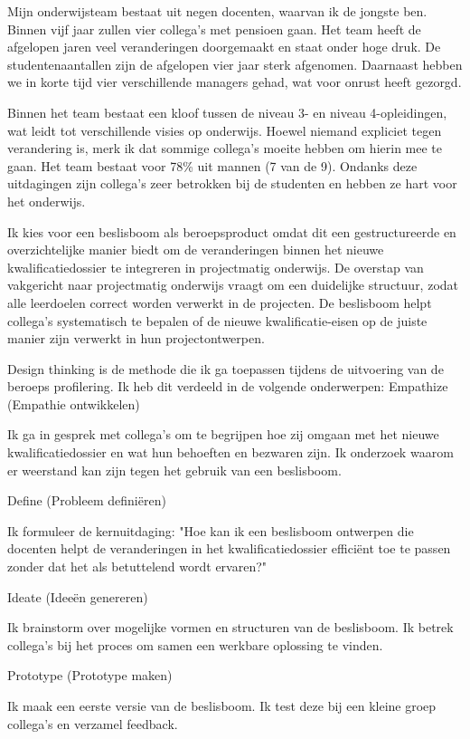 Mijn onderwijsteam bestaat uit negen docenten, waarvan ik de jongste ben. Binnen vijf jaar zullen vier collega’s met pensioen gaan. Het team heeft de afgelopen jaren veel veranderingen doorgemaakt en staat onder hoge druk. De studentenaantallen zijn de afgelopen vier jaar sterk afgenomen. Daarnaast hebben we in korte tijd vier verschillende managers gehad, wat voor onrust heeft gezorgd.

Binnen het team bestaat een kloof tussen de niveau 3- en niveau 4-opleidingen, wat leidt tot verschillende visies op onderwijs. Hoewel niemand expliciet tegen verandering is, merk ik dat sommige collega’s moeite hebben om hierin mee te gaan. Het team bestaat voor 78\% uit mannen (7 van de 9). Ondanks deze uitdagingen zijn collega’s zeer betrokken bij de studenten en hebben ze hart voor het onderwijs.

Ik kies voor een beslisboom als beroepsproduct omdat dit een gestructureerde en overzichtelijke manier biedt om de veranderingen binnen het nieuwe kwalificatiedossier te integreren in projectmatig onderwijs. De overstap van vakgericht naar projectmatig onderwijs vraagt om een duidelijke structuur, zodat alle leerdoelen correct worden verwerkt in de projecten. De beslisboom helpt collega’s systematisch te bepalen of de nieuwe kwalificatie-eisen op de juiste manier zijn verwerkt in hun projectontwerpen.

Design thinking is de methode die ik ga toepassen tijdens de uitvoering van de beroeps profilering. Ik heb dit verdeeld in de volgende onderwerpen:
Empathize (Empathie ontwikkelen)

    Ik ga in gesprek met collega’s om te begrijpen hoe zij omgaan met het nieuwe kwalificatiedossier en wat hun behoeften en bezwaren zijn.
    Ik onderzoek waarom er weerstand kan zijn tegen het gebruik van een beslisboom.

Define (Probleem definiëren)

    Ik formuleer de kernuitdaging: "Hoe kan ik een beslisboom ontwerpen die docenten helpt de veranderingen in het kwalificatiedossier efficiënt toe te passen zonder dat het als betuttelend wordt ervaren?"

Ideate (Ideeën genereren)

    Ik brainstorm over mogelijke vormen en structuren van de beslisboom.
    Ik betrek collega’s bij het proces om samen een werkbare oplossing te vinden.

Prototype (Prototype maken)

    Ik maak een eerste versie van de beslisboom.
    Ik test deze bij een kleine groep collega’s en verzamel feedback.

